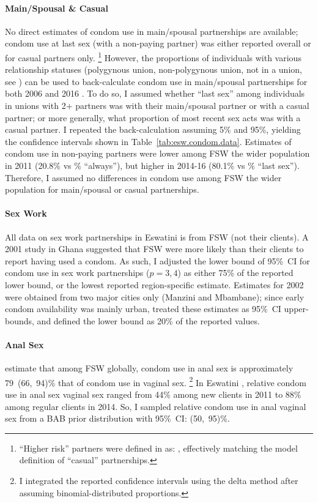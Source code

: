 \paragraph{Main/Spousal \& Casual}
No direct estimates of condom use in main/spousal partnerships are available;
condom use at last sex (with a non-paying partner)
was either reported overall or for casual partners only.%
\footnote{``Higher risk'' partners were defined in \cite{SDHS2006} as:
  ,
    effectively matching the model definition of ``casual'' partnerships.}
However, the proportions of individuals with various relationship statuses
(\eg polygynous union, non-polygynous union, not in a union, see )
can be used to back-calculate condom use in main/spousal partnerships
for both 2006 \cite{SDHS2006} and 2016 \cite{SHIMS2}.
To do so, I assumed whether ``last sex'' among individuals in unions with 2+ partners
was with their main/spousal partner or with a casual partner;
or more generally, what proportion of most recent sex acts was with a casual partner.
I repeated the back-calculation assuming 5\% and 95\%,
yielding the confidence intervals shown in Table~\ref{tab:esw.condom.data}.
Estimates of condom use in non-paying partners were
lower among FSW \vs the wider population in 2011 (20.8\% vs \% ``always''), but
higher in 2014-16 (80.1\% vs \% ``last sex'').
Therefore, I assumed no differences in condom use
among FSW \vs the wider population for main/spousal or casual partnerships.
\paragraph{Sex Work}
All data on sex work partnerships in Eswatini is from FSW (\ie not their clients).
A 2001 study in Ghana \cite{Cote2004} suggested that
FSW were more likely than their clients to report having used a condom.
As such, I adjusted the lower bound of 95\%~CI for condom use in sex work partnerships ($p=3,4$)
as either 75\% of the reported lower bound, or the lowest reported region-specific estimate.
Estimates for 2002 \cite{EswSBSS2002} were obtained from two major cities only (Manzini and Mbambane);
since early condom availability was mainly urban,
treated these estimates as 95\%~CI upper-bounds,
and defined the lower bound as 20\% of the reported values.
\paragraph{Anal Sex}
\citet{Owen2020} estimate that among FSW globally,
condom use in anal sex is approximately 79~(66,~94)\% that of condom use in vaginal sex.%
\footnote{I integrated the reported confidence intervals using the delta method
  after assuming binomial-distributed proportions.}
In Eswatini \cite{Baral2014,EswKP2014}, relative condom use in anal sex \vs vaginal sex
ranged from 44\% among new clients in 2011 to 88\% among regular clients in 2014.
So, I sampled relative condom use in anal \vs vaginal sex from a BAB prior distribution
with 95\%~CI: (50,~95)\%.
